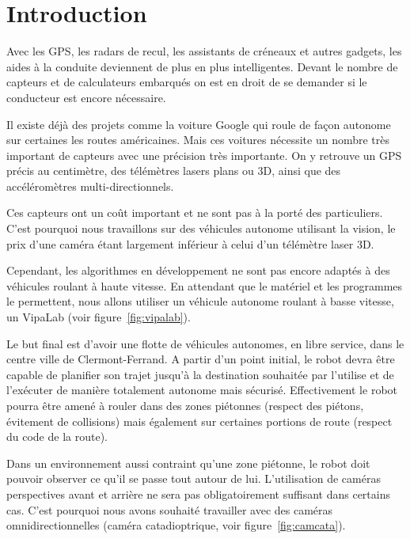 \section{Introduction}

Avec les GPS, les radars de recul, les assistants de créneaux et autres gadgets, les aides à la conduite deviennent de plus en plus intelligentes.
Devant le nombre de capteurs et de calculateurs embarqués on est en droit de se demander si le conducteur est encore nécessaire.

Il existe déjà des projets comme la voiture Google qui roule de façon autonome sur certaines les routes américaines. Mais ces voitures nécessite un nombre très important de capteurs avec une précision très importante.
On y retrouve un GPS précis au centimètre, des télémètres lasers plans ou 3D, ainsi que des accéléromètres multi-directionnels.

Ces capteurs ont un coût important et ne sont pas à la porté des particuliers.
C'est pourquoi nous travaillons sur des véhicules autonome utilisant la vision, le prix d'une caméra étant largement inférieur à celui d'un télémètre laser 3D.

Cependant, les algorithmes en développement ne sont pas encore adaptés à des véhicules roulant à haute vitesse.
En attendant que le matériel et les programmes le permettent, nous allons utiliser un véhicule autonome roulant à basse vitesse, un VipaLab (voir figure~\ref{fig:vipalab}).


Le but final est d'avoir une flotte de véhicules autonomes, en libre service, dans le centre ville de Clermont-Ferrand.
A partir d'un point initial, le robot devra être capable de planifier son trajet jusqu'à la destination souhaitée par l'utilise et de l'exécuter de manière totalement autonome mais sécurisé.
Effectivement le robot pourra être amené à rouler dans des zones piétonnes (respect des piétons, évitement de collisions) mais également sur certaines portions de route (respect du code de la route).

Dans un environnement aussi contraint qu'une zone piétonne, le robot doit pouvoir observer ce qu'il se passe tout autour de lui.
L'utilisation de caméras perspectives avant et arrière ne sera pas obligatoirement suffisant dans certains cas.
C'est pourquoi nous avons souhaité travailler avec des caméras omnidirectionnelles (caméra catadioptrique, voir figure~\ref{fig:camcata}).

